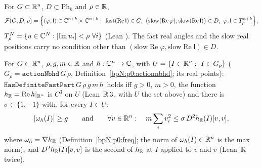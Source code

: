 \begin{definition}\label{bpN:p0:partial-domain}
For $G\subset\mathbb{R}^n$, $D\subset\mathrm{Ph}_k$ and $\rho\in\mathbb{R}$,
\[\mathcal F(G,D,\rho)=\Bigl\{(\varphi,\mathsf I)\in\C^{n+k}\times\C^{n+k}:\ \mathrm{fast}(\operatorname{Re}\mathsf I)\in G,\ \bigl(\mathrm{slow}(\operatorname{Re}\varphi),\mathrm{slow}(\operatorname{Re}\mathsf I)\bigr)\in D,\ \varphi,\mathsf I\in T^{n+k}_\rho\Bigr\},\]
$T^{N}_\rho=\{u\in\C^N:\abs{\operatorname{Im}u_i}<\rho\ \forall i\}$ (Lean ). The fast real angles and the slow real positions carry no condition other than $(\mathrm{slow}\operatorname{Re}\varphi,\mathrm{slow}\operatorname{Re}\mathsf I)\in D$.
\end{definition}

\begin{definition}\label{bpN:p0:partial-definite}
For $G\subset\mathbb{R}^n$, $\rho,g,m\in\mathbb{R}$ and $h:\mathbb{C}^n\to\mathbb{C}$, with $U=\{I\in\mathbb{R}^n:\ I\in G_\rho\}$ ($G_\rho=\texttt{actionNbhd}\,G\,\rho$, Definition~\ref{bpN:p0:actionnbhd}; its real points):
$\texttt{HasDefiniteFastPart}\,G\,\rho\,g\,m\,h$\allowbreak\ holds iff $g>0$, $m>0$, the function $h_{\mathbb{R}}=\operatorname{Re}h|_{\mathbb{R}^n}$ is $C^3$ on $U$ (Lean \,$\mathbb{R}\,3$, with $U$ the set above) and there is $\sigma\in\{1,-1\}$ with, for every $I\in U$:
\[\lvert \omega_h(I)\rvert\ge g\qquad\text{and}\qquad \forall v\in\mathbb{R}^n:\quad m\sum_iv_i^2\le\sigma\,D^2h_{\mathbb{R}}(I)[v,v],\]
where $\omega_h=\nabla h_{\mathbb{R}}$ (Definition~\ref{bpN:p0:freq}; the norm of $\omega_h(I)\in\mathbb{R}^n$ is the max norm), and $D^2h_{\mathbb{R}}(I)[v,v]$ is the second  of $h_{\mathbb{R}}$ at $I$ applied to $v$ and $v$ (Lean \,$\mathbb{R}$ twice).
\end{definition}

